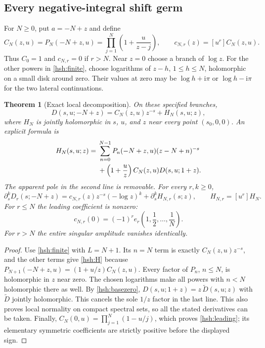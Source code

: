 \documentclass[11pt,a4paper]{article}
\numberwithin{equation}{section}
\newtheorem{theorem}{Theorem}[section]
\theoremstyle{definition}
\theoremstyle{remark}
\begin{document}
\subsection{Every negative-integral shift germ}

For $N\geq0$, put $a=-N+z$ and define
\begin{equation}\label{hsh:C}
 C_N(z,u)=P_N(-N+z,u)
          =\prod_{j=1}^{N}\left(1+\frac{u}{z-j}\right),
 \qquad c_{N,r}(z)=[u^r]C_N(z,u).
\end{equation}
Thus $C_0=1$ and $c_{N,r}=0$ if $r>N$.  Near $z=0$ choose
a branch of $\log z$.  For the other powers in
\eqref{hsh:finite}, choose logarithms of $z-h$, $1\leq h\leq N$,
holomorphic on a small disk around zero.  Their values at zero may be
$\log h+\mathrm i\pi$ or $\log h-\mathrm i\pi$ for the two lateral
continuations.

\begin{theorem}[Exact local decomposition]\label{hsh:germ}
On these specified branches,
\begin{equation}\label{hsh:local}
 D(s,u;-N+z)=C_N(z,u)z^{-s}+H_N(s,u;z),
\end{equation}
where $H_N$ is jointly holomorphic in $s$, $u$, and $z$ near
every point $(s_0,0,0)$.  An explicit formula is
\begin{align}
 H_N(s,u;z)={}&
 \sum_{n=0}^{N-1}P_n(-N+z,u)(z-N+n)^{-s}\notag\\
 &+\left(1+\frac uz\right)C_N(z,u)D(s,u;1+z).
                                                     \label{hsh:H}
\end{align}
The apparent pole in the second line is removable.  For every
$r,k\geq0$,
\begin{equation}\label{hsh:localjets}
 \partial_s^kD_r(s;-N+z)
   =c_{N,r}(z)z^{-s}(-\log z)^k
                         +\partial_s^kH_{N,r}(s;z),
 \qquad H_{N,r}=[u^r]H_N.
\end{equation}
For $r\leq N$ the leading coefficient is nonzero:
\begin{equation}\label{hsh:leading}
 c_{N,r}(0)=(-1)^r e_r\left(1,\frac12,\ldots,\frac1N\right).
\end{equation}
For $r>N$ the entire singular amplitude vanishes identically.
\end{theorem}

\begin{proof}
Use \eqref{hsh:finite} with $L=N+1$.  Its $n=N$ term is exactly
$C_N(z,u)z^{-s}$, and the other terms give \eqref{hsh:H} because
$P_{N+1}(-N+z,u)=(1+u/z)C_N(z,u)$.
Every factor of $P_n$, $n\leq N$, is holomorphic in $z$ near
zero.  The chosen logarithms make all powers with $n<N$
holomorphic there as well.  By \eqref{hsh:basezero},
$D(s,u;1+z)=z\,\widetilde D(s,u;z)$ with $\widetilde D$
jointly holomorphic.  This cancels the sole $1/z$ factor in the
last line.  This also proves local normality on compact spectral
sets, so all the stated derivatives can be taken.  Finally,
$C_N(0,u)=\prod_{j=1}^{N}(1-u/j)$, which proves
\eqref{hsh:leading}; its elementary symmetric coefficients are
strictly positive before the displayed sign.
\end{proof}
\end{document}
